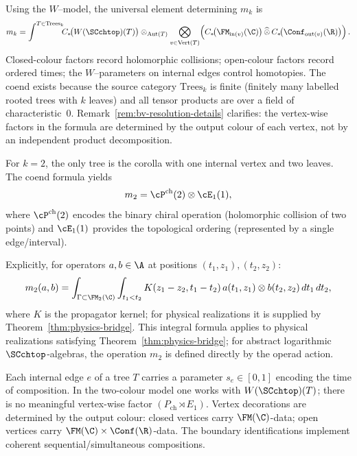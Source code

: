 \begin{construction}
\label{const:coend-formula-mk}
Using the $W$--model, the universal element determining $m_k$ is
\[
 m_k = \int^{T \in \mathrm{Trees}_k} \!\!\! C_\ast\!\bigl(W(\SCchtop)(T)\bigr)\otimes_{\mathrm{Aut}(T)}
 \bigotimes_{v \in \mathrm{Vert}(T)} \Bigl(
 C_\ast\!\bigl(\FM_{\mathrm{in}(v)}(\C)\bigr)\,\widehat{\otimes}\,
 C_\ast\!\bigl(\Conf_{\mathrm{out}(v)}(\R)\bigr)
 \Bigr)\, .
\]
Closed-colour factors record holomorphic collisions; open-colour factors record ordered
times; the $W$--parameters on internal edges control homotopies.
The coend exists because the source category $\mathrm{Trees}_k$ is finite
(finitely many labelled rooted trees with $k$ leaves) and all tensor
products are over a field of characteristic~$0$.
Remark~\ref{rem:bv-resolution-details} clarifies: the vertex-wise factors in the formula are
determined by the output colour of each vertex, not by an independent
product decomposition.

\begin{example}
For $k=2$, the only tree is the corolla with one internal vertex and two leaves. The coend formula yields
\[
m_2 = \cP^{\mathrm{ch}}(2) \otimes \cE_1(1),
\]
where $\cP^{\mathrm{ch}}(2)$ encodes the binary chiral operation (holomorphic collision of two points) and $\cE_1(1)$ provides the topological ordering (represented by a single edge/interval).

Explicitly, for operators $a, b \in \A$ at positions $(t_1, z_1), (t_2, z_2)$:
\[
m_2(a,b) = \int_{\Gamma \subset \FM_2(\C)} \int_{t_1 < t_2} K(z_1 - z_2, t_1 - t_2) \, a(t_1,z_1) \otimes b(t_2,z_2) \, dt_1 \, dt_2,
\]
where $K$ is the propagator kernel; for physical realizations it is supplied by Theorem~\ref{thm:physics-bridge}.
This integral formula applies to physical realizations satisfying Theorem~\ref{thm:physics-bridge}; for abstract logarithmic $\SCchtop$-algebras, the operation $m_2$ is defined directly by the operad action.
\end{example}

\begin{remark}
\label{rem:bv-resolution-details}
Each internal edge $e$ of a tree $T$ carries a parameter $s_e\in[0,1]$ encoding the time of
composition. In the two-colour model one works with $W(\SCchtop)(T)$; there is no meaningful
vertex-wise factor $(P_{\mathrm{ch}}\rtimes E_1)$. Vertex decorations are determined by the output
colour: closed vertices carry $\FM(\C)$-data; open vertices carry $\FM(\C)\times \Conf(\R)$-data. The
boundary identifications implement coherent sequential/simultaneous compositions.
\end{remark}
\end{construction}

